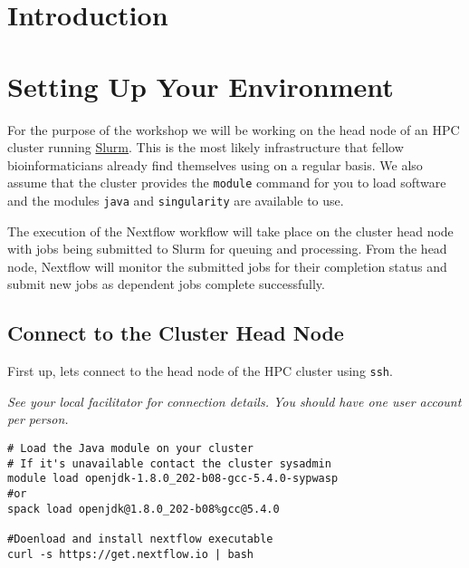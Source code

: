 \newpage

\section{Introduction}


\newpage

\section{Setting Up Your Environment}

For the purpose of the workshop we will be working on the head node of an HPC cluster running \href{https://slurm.schedmd.com/documentation.html}{Slurm}.
This is the most likely infrastructure that fellow bioinformaticians already find themselves using
on a regular basis. We also assume that the cluster provides the \texttt{module} command for you to
load software and the modules \texttt{java} and \texttt{singularity} are available to use.

The execution of the Nextflow workflow will take place on the cluster head node with jobs
being submitted to Slurm for queuing and processing. From the head node, Nextflow will monitor the
submitted jobs for their completion status and submit new jobs as dependent jobs complete successfully.


\subsection{Connect to the Cluster Head Node}

\begin{steps}
First up, lets connect to the head node of the HPC cluster using \texttt{ssh}.

\emph{See your local facilitator for connection details. You should have one user account per person.}
\end{steps}


\begin{steps}
\begin{lstlisting}
# Load the Java module on your cluster
# If it's unavailable contact the cluster sysadmin
module load openjdk-1.8.0_202-b08-gcc-5.4.0-sypwasp 
#or 
spack load openjdk@1.8.0_202-b08%gcc@5.4.0

#Doenload and install nextflow executable
curl -s https://get.nextflow.io | bash
\end{lstlisting}
\end{steps}

